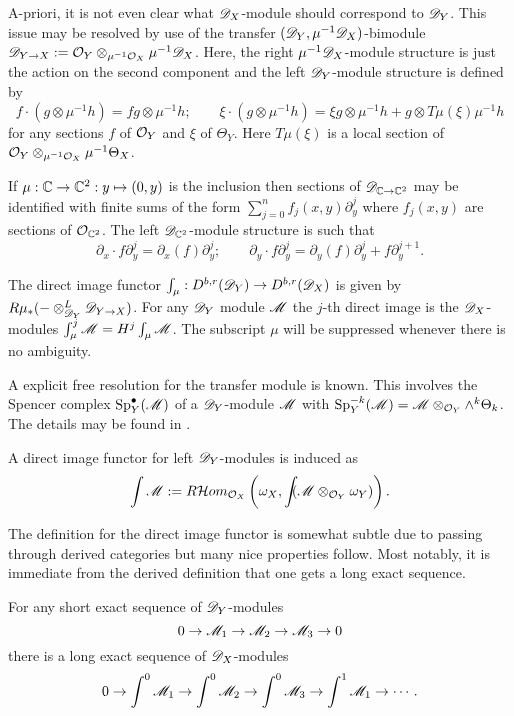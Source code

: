 A-priori, it is not even clear what $\mathscr{D}_X$-module should correspond to $\mathscr{D}_Y$.
This issue may be resolved by use of the transfer $(\mathscr{D}_Y,\mu^{-1}\mathscr{D}_X)$-bimodule $\mathscr{D}_{Y\to X}:= \mathcal{O}_Y \otimes_{\mu^{-1}\mathcal{O}_X}\mu^{-1}\mathscr{D}_X$.
Here, the right $\mu^{-1}\mathscr{D}_X$-module structure is just the action on the second component and the left $\mathscr{D}_Y$-module structure is defined by
$$f\cdot (g\otimes \mu^{-1}h) = fg \otimes \mu^{-1}h; \qquad \xi\cdot (g\otimes\mu^{-1}h) = \xi g \otimes \mu^{-1}h + g \otimes T\mu(\xi)\mu^{-1}h $$
for any sections $f$ of $\mathcal{O}_Y$ and $\xi$ of $\Theta_Y$.
Here $T\mu(\xi)$ is a local section of $\mathcal{O}_Y\otimes_{\mu^{-1}\mathcal{O}_X} \mu^{-1}\Theta_X$.
\begin{example}
  If $\mu:\mathbb{C} \to \mathbb{C}^2:y\mapsto (0,y)$ is the inclusion then sections of $\mathscr{D}_{\mathbb{C}\to \mathbb{C}^2}$ may be identified with finite sums of the form $\sum_{j=0}^n f_j(x,y)\partial_y^j$ where $f_j(x,y)$ are sections of $\mathcal{O}_{\mathbb{C}^2}$.
  The left $\mathscr{D}_{\mathbb{C}^2}$-module structure is such that
  $$\partial_x \cdot f\partial_y^j = \partial_{x}(f)\partial_y^j;\qquad \partial_y\cdot f\partial_{y}^j = \partial_y(f)\partial_y^j + f \partial_y^{j+1}.$$
\end{example}
\begin{definition}
  The direct image functor $\int_\mu:D^{b,r}(\mathscr{D}_Y)\to D^{b,r}(\mathscr{D}_X)$ is given by $R\mu_* ({-}\otimes_{\mathscr{D}_Y}^L \mathscr{D}_{Y\to X})$.
  For any $\mathscr{D}_Y$ module $\mathscr{M}$ the $j$-th direct image is the $\mathscr{D}_X$-modules $\int_\mu^j \mathscr{M} = H^j \int_\mu \mathscr{M}$.
  The subscript $\mu$ will be suppressed whenever there is no ambiguity.
\end{definition}
\begin{remark}
  A explicit free resolution for the transfer module is known.
  This involves the Spencer complex $\operatorname{Sp}_Y^\bullet(\mathscr{M})$ of a $\mathscr{D}_Y$-module $\mathscr{M}$ with $\operatorname{Sp}_Y^{-k}(\mathscr{M}) = \mathscr{M}\otimes_{\mathcal{O}_Y}\wedge^k \Theta_k$.
  The details may be found in \cite{sabbah2011introduction}.
\end{remark}
\begin{remark}
  A direct image functor for left $\mathscr{D}_Y$-modules is induced as  $$\int\mathscr{M} := R\mathcal{H}om_{\mathcal{O}_X}\left(\omega_X,\int\mkern -8mu  (\mathscr{M}\otimes_{\mathcal{O}_Y} \omega_Y)\right).$$
\end{remark}
The definition for the direct image functor is somewhat subtle due to passing through derived categories but many nice properties follow.
Most notably, it is immediate from the derived definition that one gets a long exact sequence.
\begin{proposition}
    For any short exact sequence of $\mathscr{D}_Y$-modules
    $$0 \to \mathscr{M}_1 \to \mathscr{M}_2 \to \mathscr{M}_3 \to 0 $$
    there is a long exact sequence of $\mathscr{D}_X$-modules
    $$0 \to \int^0\mathscr{M}_1 \to \int^0 \mathscr{M}_2 \to \int^0 \mathscr{M}_3 \to \int^1 \mathscr{M}_1 \to \cdots.$$
\end{proposition}

